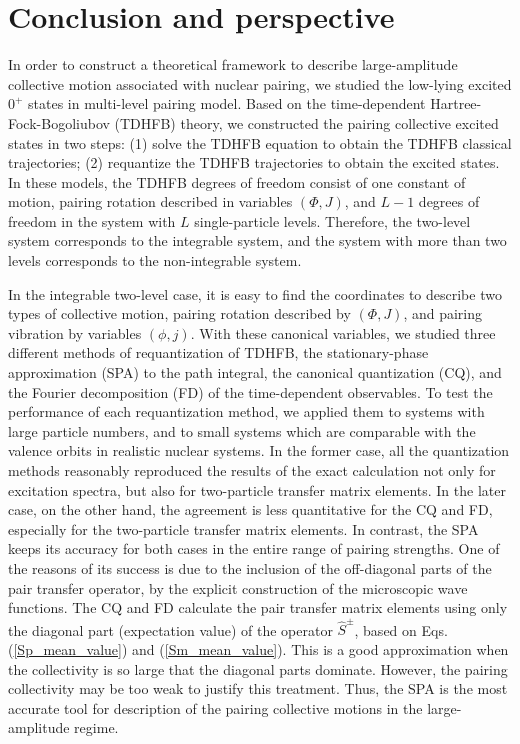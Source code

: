 \documentclass[11pt]{book} %
\begin{document}
\clearpage{\pagestyle{empty}\cleardoublepage}
\chapter{Conclusion and perspective}
\label{conclusion}

In order to construct a theoretical framework to describe large-amplitude collective motion associated with nuclear pairing, we studied the low-lying excited $0^+$ states in multi-level pairing model. Based on the time-dependent Hartree-Fock-Bogoliubov (TDHFB) theory, we constructed the pairing collective excited states in two steps: (1) solve the TDHFB equation to obtain the TDHFB classical trajectories; (2) requantize the TDHFB trajectories to obtain the excited states. In these models, the TDHFB degrees of freedom consist of one constant of motion, pairing rotation described in variables $(\Phi, J)$, and $L-1$ degrees of freedom in the system with $L$ single-particle levels. Therefore, the two-level system corresponds to the integrable system, and the system with more than two levels corresponds to the non-integrable system. 

In the integrable two-level case, it is easy to find the coordinates to describe two types of collective motion, pairing rotation described by $(\Phi, J)$, and pairing vibration by variables $(\phi, j)$. With these canonical variables, we studied three different methods of requantization of TDHFB, the stationary-phase approximation (SPA) to the path integral, the canonical quantization (CQ), and the Fourier decomposition (FD) of the time-dependent observables. 
To test the performance of each requantization method, we applied them to systems with large particle numbers, and to small systems which are comparable with the valence orbits in realistic nuclear systems. 
In the former case, all the quantization methods reasonably reproduced the results of the
exact calculation not only for excitation spectra, but also for two-particle transfer matrix elements.
In the later case, on the other hand, the agreement is
less quantitative for the CQ and FD, especially for the two-particle
transfer matrix elements.
In contrast, the SPA keeps its accuracy for both cases in the entire range of
pairing strengths.
One of the reasons of its success is due to the inclusion of the off-diagonal 
parts of the pair transfer operator,
by the explicit construction of the microscopic wave functions.
The CQ and FD calculate the pair transfer matrix elements using only
the diagonal part (expectation value) of the operator $\hat{S}^\pm$,
based on Eqs. (\ref{Sp_mean_value}) and (\ref{Sm_mean_value}).
This is a good approximation when the collectivity is so large that the
diagonal parts dominate.
However, the pairing collectivity may be too weak to justify this
treatment.
Thus, the SPA is the most accurate tool for description of the pairing collective motions in the large-amplitude regime.
\end{document}
